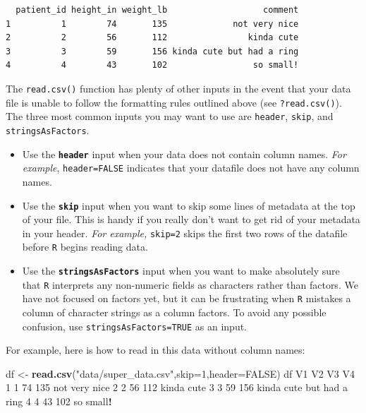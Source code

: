 \documentclass[
]{book}
\newenvironment{Shaded}{\begin{snugshade}}{\end{snugshade}}
\newcommand{\AttributeTok}[1]{\textcolor[rgb]{0.13,0.29,0.53}{#1}}
\newcommand{\ConstantTok}[1]{\textcolor[rgb]{0.56,0.35,0.01}{#1}}
\newcommand{\DecValTok}[1]{\textcolor[rgb]{0.00,0.00,0.81}{#1}}
\newcommand{\FunctionTok}[1]{\textcolor[rgb]{0.13,0.29,0.53}{\textbf{#1}}}
\newcommand{\NormalTok}[1]{#1}
\newcommand{\OtherTok}[1]{\textcolor[rgb]{0.56,0.35,0.01}{#1}}
\newcommand{\SpecialCharTok}[1]{\textcolor[rgb]{0.81,0.36,0.00}{\textbf{#1}}}
\newcommand{\StringTok}[1]{\textcolor[rgb]{0.31,0.60,0.02}{#1}}
\begin{document}
\begin{verbatim}
  patient_id height_in weight_lb                   comment
1          1        74       135             not very nice
2          2        56       112                kinda cute
3          3        59       156 kinda cute but had a ring
4          4        43       102                 so small!
\end{verbatim}

The \texttt{read.csv()} function has plenty of other inputs in the event that your data file is unable to follow the formatting rules outlined above (see \texttt{?read.csv()}). The three most common inputs you may want to use are \texttt{header}, \texttt{skip}, and \texttt{stringsAsFactors}.

\begin{itemize}
\item
  Use the \textbf{\texttt{header}} input when your data does not contain column names. \emph{For example}, \texttt{header=FALSE} indicates that your datafile does not have any column names.
\item
  Use the \textbf{\texttt{skip}} input when you want to skip some lines of metadata at the top of your file. This is handy if you really don't want to get rid of your metadata in your header. \emph{For example,} \texttt{skip=2} skips the first two rows of the datafile before \texttt{R} begins reading data.
\item
  Use the \textbf{\texttt{stringsAsFactors}} input when you want to make absolutely sure that \texttt{R} interprets any non-numeric fields as characters rather than factors. We have not focused on factors yet, but it can be frustrating when \texttt{R} mistakes a column of character strings as a column factors. To avoid any possible confusion, use \texttt{stringsAsFactors=TRUE} as an input.
\end{itemize}

For example, here is how to read in this data without column names:

\begin{Shaded}
\begin{Highlighting}[]
\NormalTok{df }\OtherTok{\textless{}{-}} \FunctionTok{read.csv}\NormalTok{(}\StringTok{"data/super\_data.csv"}\NormalTok{,}\AttributeTok{skip=}\DecValTok{1}\NormalTok{,}\AttributeTok{header=}\ConstantTok{FALSE}\NormalTok{)}
\NormalTok{df}
\NormalTok{  V1 V2  V3                        V4}
\DecValTok{1}  \DecValTok{1} \DecValTok{74} \DecValTok{135}\NormalTok{             not very nice}
\DecValTok{2}  \DecValTok{2} \DecValTok{56} \DecValTok{112}\NormalTok{                kinda cute}
\DecValTok{3}  \DecValTok{3} \DecValTok{59} \DecValTok{156}\NormalTok{ kinda cute but had a ring}
\DecValTok{4}  \DecValTok{4} \DecValTok{43} \DecValTok{102}\NormalTok{                 so small}\SpecialCharTok{!}
\end{Highlighting}
\end{Shaded}
\end{document}
